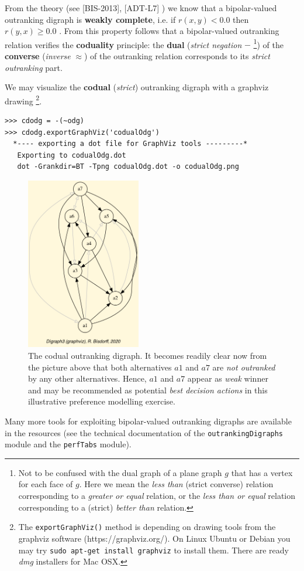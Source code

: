 From the theory (see [BIS-2013], [ADT-L7] ) we know that a bipolar-valued outranking digraph is {\bf weakly complete}, i.e. if $r(x,y) < 0.0$ then $r(y,x) \geq 0.0$ . From this property follows that a bipolar-valued outranking relation verifies the {\bf coduality} principle: the {\bf dual} ({\em strict negation\/} $-$ \footnote{Not to be confused with the dual graph of a plane graph $g$ that has a vertex for each face of $g$. Here we mean the \emph{less than} (strict converse) relation corresponding to a \emph{greater or equal} relation, or the \emph{less than or equal} relation corresponding to a (strict) \emph{better than} relation.}) of the {\bf converse} ({\em inverse\/} $\approx$) of the outranking relation corresponds to its {\em strict outranking\/} part.

We may visualize the {\bf codual} ({\em strict\/}) outranking digraph with a graphviz drawing \footnote{The \texttt{exportGraphViz()} method is depending on drawing tools from the graphviz software (https://graphviz.org/). On Linux Ubuntu or Debian you may try \texttt{sudo apt-get install graphviz} to install them. There are ready \emph{dmg} installers for Mac OSX.}.

\begin{lstlisting}
>>> cdodg = -(~odg)
>>> cdodg.exportGraphViz('codualOdg')
  *---- exporting a dot file for GraphViz tools ---------*
   Exporting to codualOdg.dot
   dot -Grankdir=BT -Tpng codualOdg.dot -o codualOdg.png
\end{lstlisting}

\begin{figure}[h]
\sidecaption
\includegraphics[width=5cm]{Figures/codualOdg.png}
\caption{The codual outranking digraph. It becomes readily clear now from the picture above that both alternatives $a1$  and $a7$ are {\em not outranked\/} by any other alternatives. Hence, $a1$  and $a7$ appear as \emph{weak} \Condorcet winner and may be recommended as potential {\em best decision actions\/} in this illustrative preference modelling exercise.}
\label{fig:3.1}       %
\end{figure}
 
Many more tools for exploiting bipolar-valued outranking digraphs are available in the  resources (see the technical documentation of the {\tt outrankingDigraphs} module and the {\tt perfTabs} module).

 
